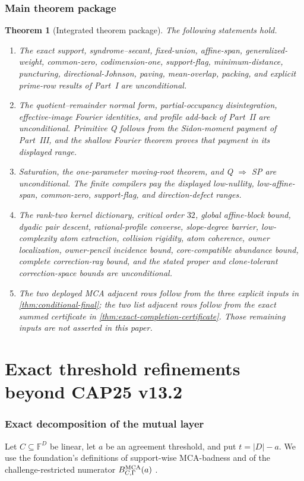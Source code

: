 \documentclass[11pt,a4paper]{amsart}
\numberwithin{equation}{section}
\newtheorem{theorem}{Theorem}[section]
\theoremstyle{remark}
\newcommand{\F}{\mathbb F}\newcommand{\B}{\mathbb B}\newcommand{\K}{\mathbb K}\newcommand{\Z}{\mathbb Z}
\begin{document}
\section{Main theorem package}\label{sec:new-contributions}
\begin{theorem}[Integrated theorem package]\label{thm:v4-package}
The following statements hold.
\begin{enumerate}[label=\textup{(\roman*)},leftmargin=*]
\item The exact support, syndrome--secant, fixed-union, affine-span, generalized-weight, common-zero, codimension-one, support-flag, minimum-distance, puncturing, directional-Johnson, paving, mean-overlap, packing, and explicit prime-row results of Part~I are unconditional.
\item The quotient--remainder normal form, partial-occupancy disintegration, effective-image Fourier identities, and profile add-back of Part~II are unconditional.  Primitive Q follows from the Sidon-moment payment of Part~III, and the shallow Fourier theorem proves that payment in its displayed range.
\item Saturation, the one-parameter moving-root theorem, and Q $\Rightarrow$ SP are unconditional.  The finite compilers pay the displayed low-nullity, low-affine-span, common-zero, support-flag, and direction-defect ranges.
\item The rank-two kernel dictionary, critical order $32$, global affine-block bound, dyadic pair descent, rational-profile converse, slope-degree barrier, low-complexity atom extraction, collision rigidity, atom coherence, owner localization, owner-pencil incidence bound, core-compatible abundance bound, complete correction-ray bound, and the stated proper and clone-tolerant correction-space bounds are unconditional.
\item The two deployed MCA adjacent rows follow from the three explicit inputs in \cref{thm:conditional-final}; the two list adjacent rows follow from the exact summed certificate in \cref{thm:exact-completion-certificate}.  Those remaining inputs are not asserted in this paper.
\end{enumerate}
\end{theorem}

\part{Exact threshold refinements beyond CAP25 v13.2}

\section{Exact decomposition of the mutual layer}\label{sec:mutual-decomposition}
Let $C\subseteq\F^D$ be linear, let $a$ be an agreement threshold, and put $t=|D|-a$.  We use the foundation's definitions of support-wise MCA-badness and of the challenge-restricted numerator $B^{\rm MCA}_{C,\Gamma}(a)$ \cite[Secs.~1--2]{CAP25v132}.
\end{document}
